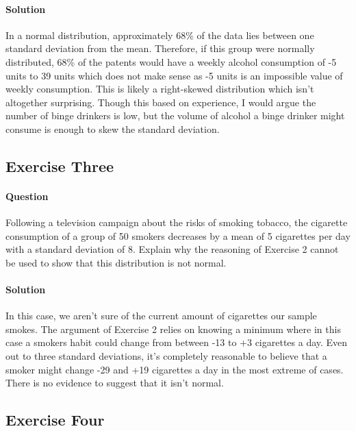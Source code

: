 \documentclass[]{article}
\let\oldparagraph\paragraph
\renewcommand{\paragraph}[1]{\oldparagraph{#1}\mbox{}}
\begin{document}
\paragraph{Solution}\label{solution-1}

In a normal distribution, approximately 68\% of the data lies between
one standard deviation from the mean. Therefore, if this group were
normally distributed, 68\% of the patents would have a weekly alcohol
consumption of -5 units to 39 units which does not make sense as -5
units is an impossible value of weekly consumption. This is likely a
right-skewed distribution which isn't altogether surprising. Though this
based on experience, I would argue the number of binge drinkers is low,
but the volume of alcohol a binge drinker might consume is enough to
skew the standard deviation.

\pagebreak

\subsection{Exercise Three}\label{exercise-three}

\paragraph{Question}\label{question-2}

Following a television campaign about the risks of smoking tobacco, the
cigarette consumption of a group of 50 smokers decreases by a mean of 5
cigarettes per day with a standard deviation of 8. Explain why the
reasoning of Exercise 2 cannot be used to show that this distribution is
not normal.

\paragraph{Solution}\label{solution-2}

In this case, we aren't sure of the current amount of cigarettes our
sample smokes. The argument of Exercise 2 relies on knowing a minimum
where in this case a smokers habit could change from between -13 to +3
cigarettes a day. Even out to three standard deviations, it's completely
reasonable to believe that a smoker might change -29 and +19 cigarettes
a day in the most extreme of cases. There is no evidence to suggest that
it isn't normal.

\subsection{Exercise Four}\label{exercise-four}
\end{document}
